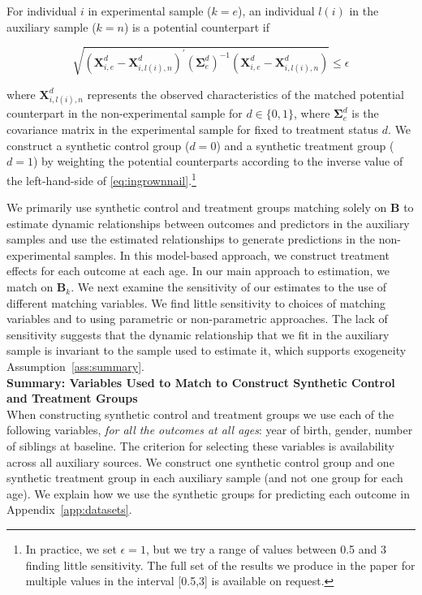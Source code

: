 \onehalfspacing
\begin{algorithm} \label{alg:match}
For individual $i$ in experimental sample ($k=e$), an individual $l(i)$ in the auxiliary sample ($k=n$) is a potential counterpart if

\begin{equation}\label{eq:ingrownnail}
\sqrt{(\bm{X}^d_{i,e} - \bm{X}^d_{i,l(i),n})^\prime (\bm{\Sigma}^d_e)^{-1} (\bm{X}^d_{i,e} - \bm{X}^d_{i,l(i),n})} \leq \epsilon
\end{equation}

\noindent where $\bm{X}^d_{i,l(i),n}$ represents the observed characteristics of the matched potential counterpart in the non-experimental sample for $d \in \{0,1\}$, where $\bm{\Sigma}^d_e$ is the covariance matrix in the experimental sample for fixed to treatment status $d$. We construct a synthetic control group ($d = 0$) and a synthetic treatment group ($d = 1$) by weighting the potential counterparts according to the inverse value of the left-hand-side of \eqref{eq:ingrownnail}.\footnote{In practice, we set $\epsilon = 1$, but we try a range of values between 0.5 and 3 finding little sensitivity. The full set of the results we produce in the paper for multiple values in the interval [0.5,3] is available on request.}
\end{algorithm}
\doublespacing

\noindent We primarily use synthetic control and treatment groups matching solely on $\bm{B}$ to estimate dynamic relationships between outcomes and predictors in the auxiliary samples and use the estimated relationships to generate predictions in the non-experimental samples. In this model-based approach, we construct treatment effects for each outcome at each age. In our main approach to estimation, we match on $\bm{B}_k$. We next examine the sensitivity of our estimates to the use of different matching variables. We find little sensitivity to choices of matching variables and to using parametric or non-parametric approaches. The lack of sensitivity suggests that the dynamic relationship that we fit in the auxiliary sample is invariant to the sample used to estimate it, which supports exogeneity Assumption~\ref{ass:summary}.\\


\noindent \textbf{Summary: Variables Used to Match to Construct Synthetic Control and Treatment Groups}\\
When constructing synthetic control and treatment groups we use each of the following variables, \textit{for all the outcomes at all ages}: year of birth, gender, number of siblings at baseline. The criterion for selecting these variables is availability across all auxiliary sources. We construct one synthetic control group and one synthetic treatment group in each auxiliary sample (and not one group for each age). We explain how we use the synthetic groups for predicting each outcome in Appendix~\ref{app:datasets}.


